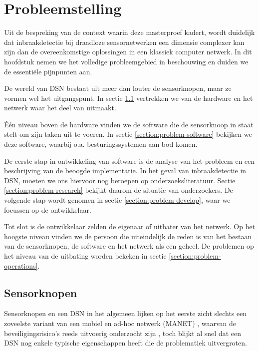 
\chapter{Probleemstelling}
\label{chapter:probleemstelling}

Uit de bespreking van de context waarin deze masterproef kadert, wordt
duidelijk dat inbraakdetectie bij draadloze sensornetwerken een dimensie
complexer kan zijn dan de overeenkomstige oplossingen in een klassiek computer
netwerk. In dit hoofdstuk nemen we het volledige probleemgebied in beschouwing
en duiden we de essenti\"ele pijnpunten aan.

De wereld van DSN bestaat uit meer dan louter de sensorknopen, maar ze vormen
wel het uitgangspunt. In sectie \ref{section:problem-hardware} vertrekken we
van de hardware en het netwerk waar het deel van uitmaakt.

\'E\'en niveau boven de hardware vinden we de software die de sensorknoop in
staat stelt om zijn taken uit te voeren. In sectie
\ref{section:problem-software} bekijken we deze software, waarbij o.a.
besturingssystemen aan bod komen.

De eerste stap  in ontwikkeling van software  is de analyse van  het probleem en
een beschrijving van de beoogde  implementatie. In het geval van inbraakdetectie
in  DSN, moeten  we ons  hiervoor nog  beroepen op  onderzoeksliteratuur. Sectie
\ref{section:problem-research} bekijkt  daarom de situatie van  onderzoekers. De
volgende  stap wordt  genomen in  sectie \ref{section:problem-develop},  waar we
focussen op de ontwikkelaar.

Tot slot is de ontwikkelaar zelden de eigenaar of uitbater van het netwerk. Op
het hoogste niveau vinden we de persoon die uiteindelijk de reden is van het
bestaan van de sensorknopen, de software en het netwerk als een geheel. De
problemen op het niveau van de uitbating worden bekeken in sectie
\ref{section:problem-operations}.

\section{Sensorknopen}
\label{section:problem-hardware}

Sensorknopen en een DSN in het algemeen lijken op het eerste zicht slechts een
zoveelste variant van een mobiel en ad-hoc netwerk (MANET)
\citep{garg2010mobile}, waarvan de beveiligingsrisico's reeds uitvoerig
onderzocht zijn \citep{djenouri2005survey, zhang2000intrusion,
kachirski2003effective}, toch blijkt al snel dat een DSN nog enkele typische
eigenschappen heeft die de problematiek uitvergroten.

